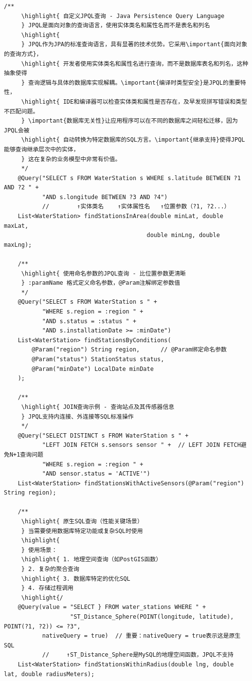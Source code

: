 \begin{lstlisting}[style=java]
    /**
     \highlight{ 自定义JPQL查询 - Java Persistence Query Language
     } JPQL是面向对象的查询语言，使用实体类名和属性名而不是表名和列名
     \highlight{ 
     } JPQL作为JPA的标准查询语言，具有显著的技术优势。它采用\important{面向对象的查询方式}，
     \highlight{ 开发者使用实体类名和属性名进行查询，而不是数据库表名和列名，这种抽象使得
     } 查询逻辑与具体的数据库实现解耦。\important{编译时类型安全}是JPQL的重要特性，
     \highlight{ IDE和编译器可以检查实体类和属性是否存在，及早发现拼写错误和类型不匹配问题。
     } \important{数据库无关性}让应用程序可以在不同的数据库之间轻松迁移，因为JPQL会被
     \highlight{ 自动转换为特定数据库的SQL方言。\important{继承支持}使得JPQL能够查询继承层次中的实体，
     } 这在复杂的业务模型中非常有价值。
     */
    @Query("SELECT s FROM WaterStation s WHERE s.latitude BETWEEN ?1 AND ?2 " +
           "AND s.longitude BETWEEN ?3 AND ?4")
           //        ↑实体类名    ↑实体属性名   ↑位置参数（?1, ?2...）
    List<WaterStation> findStationsInArea(double minLat, double maxLat, 
                                         double minLng, double maxLng);
    
    /**
     \highlight{ 使用命名参数的JPQL查询 - 比位置参数更清晰
     } :paramName 格式定义命名参数，@Param注解绑定参数值
     */
    @Query("SELECT s FROM WaterStation s " +
           "WHERE s.region = :region " +
           "AND s.status = :status " +
           "AND s.installationDate >= :minDate")
    List<WaterStation> findStationsByConditions(
        @Param("region") String region,      // @Param绑定命名参数
        @Param("status") StationStatus status,
        @Param("minDate") LocalDate minDate
    );
    
    /**
     \highlight{ JOIN查询示例 - 查询站点及其传感器信息
     } JPQL支持内连接、外连接等SQL标准操作
     */
    @Query("SELECT DISTINCT s FROM WaterStation s " +
           "LEFT JOIN FETCH s.sensors sensor " +  // LEFT JOIN FETCH避免N+1查询问题
           "WHERE s.region = :region " +
           "AND sensor.status = 'ACTIVE'")
    List<WaterStation> findStationsWithActiveSensors(@Param("region") String region);
    
    /**
     \highlight{ 原生SQL查询（性能关键场景）
     } 当需要使用数据库特定功能或复杂SQL时使用
     \highlight{ 
     } 使用场景：
     \highlight{ 1. 地理空间查询（如PostGIS函数）
     } 2. 复杂的聚合查询
     \highlight{ 3. 数据库特定的优化SQL
     } 4. 存储过程调用
     \highlight{/
    @Query(value = "SELECT } FROM water_stations WHERE " +
                   "ST_Distance_Sphere(POINT(longitude, latitude), POINT(?1, ?2)) <= ?3",
           nativeQuery = true)  // 重要：nativeQuery = true表示这是原生SQL
           //     ↑ST_Distance_Sphere是MySQL的地理空间函数，JPQL不支持
    List<WaterStation> findStationsWithinRadius(double lng, double lat, double radiusMeters);
    

\end{lstlisting}
